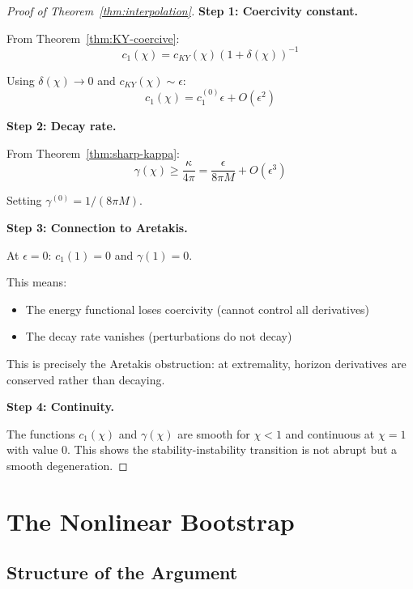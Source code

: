 \documentclass[12pt,a4paper]{article}
\begin{document}
\begin{proof}[Proof of Theorem~\ref{thm:interpolation}]
\textbf{Step 1: Coercivity constant.}

From Theorem~\ref{thm:KY-coercive}:
\begin{equation}
c_1(\chi) = c_{KY}(\chi)(1 + \delta(\chi))^{-1}
\end{equation}

Using $\delta(\chi) \to 0$ and $c_{KY}(\chi) \sim \epsilon$:
\begin{equation}
c_1(\chi) = c_1^{(0)}\epsilon + O(\epsilon^2)
\end{equation}

\textbf{Step 2: Decay rate.}

From Theorem~\ref{thm:sharp-kappa}:
\begin{equation}
\gamma(\chi) \geq \frac{\kappa}{4\pi} = \frac{\epsilon}{8\pi M} + O(\epsilon^3)
\end{equation}

Setting $\gamma^{(0)} = 1/(8\pi M)$.

\textbf{Step 3: Connection to Aretakis.}

At $\epsilon = 0$: $c_1(1) = 0$ and $\gamma(1) = 0$.

This means:
\begin{itemize}
    \item The energy functional loses coercivity (cannot control all derivatives)
    \item The decay rate vanishes (perturbations do not decay)
\end{itemize}

This is precisely the Aretakis obstruction: at extremality, horizon derivatives are conserved rather than decaying.

\textbf{Step 4: Continuity.}

The functions $c_1(\chi)$ and $\gamma(\chi)$ are smooth for $\chi < 1$ and continuous at $\chi = 1$ with value 0. This shows the stability-instability transition is not abrupt but a smooth degeneration.
\end{proof}

\section{The Nonlinear Bootstrap}

\subsection{Structure of the Argument}
\end{document}
